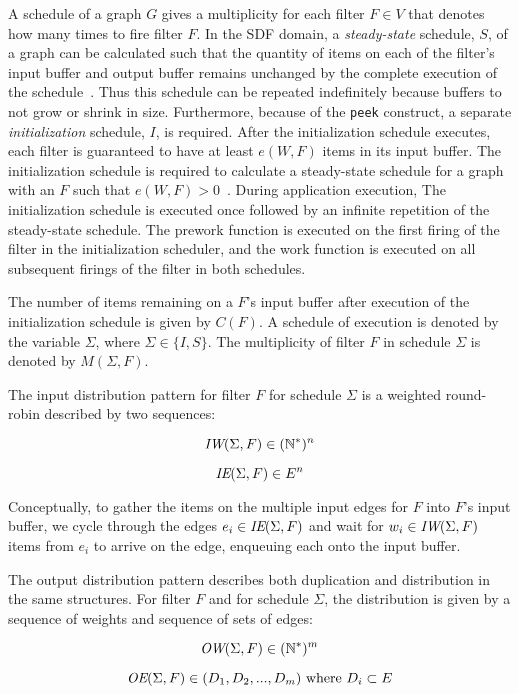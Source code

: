 A schedule of a graph $G$ gives a multiplicity for each filter $F \in
V$ that denotes how many times to fire filter $F$. In the SDF domain,
a {\it steady-state} schedule, $S$, of a graph can be calculated such
that the quantity of items on each of the filter's input buffer and
output buffer remains unchanged by the complete execution of the
schedule~\cite{lee87}.  Thus this schedule can be repeated
indefinitely because buffers to not grow or shrink in size.
Furthermore, because of the {\tt peek} construct, a separate {\it
initialization} schedule, $I$, is required. After the initialization
schedule executes, each filter is guaranteed to have at least $e(W,
F)$ items in its input buffer. The initialization schedule is required
to calculate a steady-state schedule for a graph with an $F$ such that
$e(W, F) > 0$~\cite{karczmarek:lctes:2003}.  During application
execution, The initialization schedule is executed once followed by an
infinite repetition of the steady-state schedule.  The prework
function is executed on the first firing of the filter in the
initialization scheduler, and the work function is executed on all
subsequent firings of the filter in both schedules.

The number of items remaining on a $F$'s input buffer after execution
of the initialization schedule is given by $C(F)$. A schedule of
execution is denoted by the variable $\Sigma$, where $\Sigma \in
\{I, S\}$.  The multiplicity of filter $F$ in schedule $\Sigma$ is
denoted by $M(\Sigma, F)$.

The input distribution pattern for filter $F$ for schedule $\Sigma$ is
a weighted round-robin described by two sequences:

\[ \mbox{\it IW}(\Sigma, F) \in (\mathbb{N}^{*})^n \]

\[ \mbox{\it IE}(\Sigma, F) \in E^n \]
 
Conceptually, to gather the items on the multiple input edges for $F$
into $F$'s input buffer, we cycle through the edges $e_i \in
\mbox{\it IE}(\Sigma, F)$ and wait for $w_i \in \mbox{\it IW}(\Sigma, F)$ items
from $e_i$ to arrive on the edge, enqueuing each onto the input buffer.

The output distribution pattern describes both duplication and
distribution in the same structures. For filter $F$ and for schedule
$\Sigma$, the distribution is given by a sequence of weights and
sequence of sets of edges:

\[ \mbox{\it OW}(\Sigma, F)  \in (\mathbb{N}^{*})^m \]

\[ \mbox{\it OE}(\Sigma, F) \in (D_1, D_2, ..., D_m)  \mbox{ where }  D_i \subset
E \]

